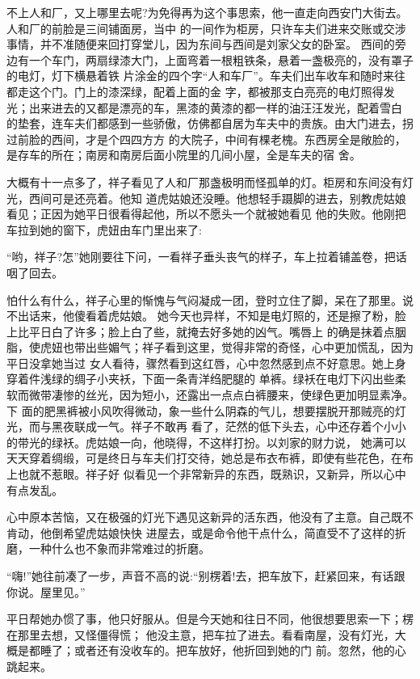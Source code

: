 \documentclass[11pt,a4paper,onecolumn]{article}
\begin{document}
不上人和厂，又上哪里去呢?为免得再为这个事思索，他一直走向西安门大街去。人和厂的前脸是三间铺面房，当中
的一间作为柜房，只许车夫们进来交账或交涉事情，并不准随便来回打穿堂儿，因为东间与西间是刘家父女的卧室。
西间的旁边有一个车门，两扇绿漆大门，上面弯着一根粗铁条，悬着一盏极亮的，没有罩子的电灯，灯下横悬着铁
片涂金的四个字\myrule ``人和车厂''。车夫们出车收车和随时来往都走这个门。门上的漆深绿，配着上面的金
字，都被那支白亮亮的电灯照得发光；出来进去的又都是漂亮的车，黑漆的黄漆的都一样的油汪汪发光，配着雪白
的垫套，连车夫们都感到一些骄傲，仿佛都自居为车夫中的贵族。由大门进去，拐过前脸的西间，才是个四四方方
的大院子，中间有棵老槐。东西房全是敞脸的，是存车的所在；南房和南房后面小院里的几间小屋，全是车夫的宿
舍。

大概有十一点多了，祥子看见了人和厂那盏极明而怪孤单的灯。柜房和东间没有灯光，西间可是还亮着。他知
道虎姑娘还没睡。他想轻手蹑脚的进去，别教虎姑娘看见；正因为她平日很看得起他，所以不愿头一个就被她看见
他的失败。他刚把车拉到她的窗下，虎妞由车门里出来了:

``哟，祥子?怎\myrule ''她刚要往下问，一看祥子垂头丧气的样子，车上拉着铺盖卷，把话咽了回去。

怕什么有什么，祥子心里的惭愧与气闷凝成一团，登时立住了脚，呆在了那里。说不出话来，他傻看着虎姑娘。
她今天也异样，不知是电灯照的，还是擦了粉，脸上比平日白了许多；脸上白了些，就掩去好多她的凶气。嘴唇上
的确是抹着点胭脂，使虎妞也带出些媚气；祥子看到这里，觉得非常的奇怪，心中更加慌乱，因为平日没拿她当过
女人看待，骤然看到这红唇，心中忽然感到点不好意思。她上身穿着件浅绿的绸子小夹袄，下面一条青洋绉肥腿的
单裤。绿袄在电灯下闪出些柔软而微带凄惨的丝光，因为短小，还露出一点点白裤腰来，使绿色更加明显素净。下
面的肥黑裤被小风吹得微动，象一些什么阴森的气儿，想要摆脱开那贼亮的灯光，而与黑夜联成一气。祥子不敢再
看了，茫然的低下头去，心中还存着个小小的带光的绿袄。虎姑娘一向，他晓得，不这样打扮。以刘家的财力说，
她满可以天天穿着绸缎，可是终日与车夫们打交待，她总是布衣布裤，即使有些花色，在布上也就不惹眼。祥子好
似看见一个非常新异的东西，既熟识，又新异，所以心中有点发乱。

心中原本苦恼，又在极强的灯光下遇见这新异的活东西，他没有了主意。自己既不肯动，他倒希望虎姑娘快快
进屋去，或是命令他干点什么，简直受不了这样的折磨，一种什么也不象而非常难过的折磨。

``嗨!''她往前凑了一步，声音不高的说:``别楞着!去，把车放下，赶紧回来，有话跟你说。屋里见。''

平日帮她办惯了事，他只好服从。但是今天她和往日不同，他很想要思索一下；楞在那里去想，又怪僵得慌；
他没主意，把车拉了进去。看看南屋，没有灯光，大概是都睡了；或者还有没收车的。把车放好，他折回到她的门
前。忽然，他的心跳起来。
\end{document}
